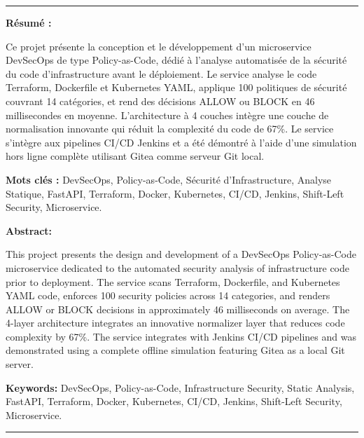 
\vspace*{\fill}

\noindent\rule{\textwidth}{0.4pt}

\vspace{0.5cm}

\noindent\textbf{Résumé :}

\noindent Ce projet présente la conception et le développement d'un microservice DevSecOps de type Policy-as-Code, dédié à l'analyse automatisée de la sécurité du code d'infrastructure avant le déploiement. Le service analyse le code Terraform, Dockerfile et Kubernetes YAML, applique 100 politiques de sécurité couvrant 14 catégories, et rend des décisions ALLOW ou BLOCK en 46 millisecondes en moyenne. L'architecture à 4 couches intègre une couche de normalisation innovante qui réduit la complexité du code de 67\%. Le service s'intègre aux pipelines CI/CD Jenkins et a été démontré à l'aide d'une simulation hors ligne complète utilisant Gitea comme serveur Git local.

\vspace{0.3cm}
\noindent\textbf{Mots clés :} DevSecOps, Policy-as-Code, Sécurité d'Infrastructure, Analyse Statique, FastAPI, Terraform, Docker, Kubernetes, CI/CD, Jenkins, Shift-Left Security, Microservice.

\vspace{1cm}

\noindent\textbf{Abstract:}

\noindent This project presents the design and development of a DevSecOps Policy-as-Code microservice dedicated to the automated security analysis of infrastructure code prior to deployment. The service scans Terraform, Dockerfile, and Kubernetes YAML code, enforces 100 security policies across 14 categories, and renders ALLOW or BLOCK decisions in approximately 46 milliseconds on average. The 4-layer architecture integrates an innovative normalizer layer that reduces code complexity by 67\%. The service integrates with Jenkins CI/CD pipelines and was demonstrated using a complete offline simulation featuring Gitea as a local Git server.

\vspace{0.3cm}
\noindent\textbf{Keywords:} DevSecOps, Policy-as-Code, Infrastructure Security, Static Analysis, FastAPI, Terraform, Docker, Kubernetes, CI/CD, Jenkins, Shift-Left Security, Microservice.

\vspace{0.5cm}

\noindent\rule{\textwidth}{0.4pt}

\vspace*{\fill}
